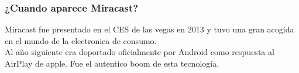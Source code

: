 \begin{frame}
  \frametitle{¿Cuando aparece Miracast?}
  Miracast fue presentado en el CES de las vegas en 2013 y tuvo una gran acogida en el mundo de la electronica de consumo.\\
  Al año siguiente era doportado oficialmente por Android como respuesta al AirPlay de apple. Fue el autentico boom de esta tecnología.
\end{frame}

